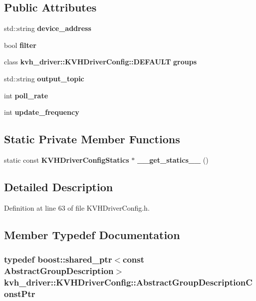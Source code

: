 \subsection*{\-Public \-Attributes}
\begin{DoxyCompactItemize}
\item 
std\-::string {\bf device\-\_\-address}
\item 
bool {\bf filter}
\item 
class \*
{\bf kvh\-\_\-driver\-::\-K\-V\-H\-Driver\-Config\-::\-D\-E\-F\-A\-U\-L\-T} {\bf groups}
\item 
std\-::string {\bf output\-\_\-topic}
\item 
int {\bf poll\-\_\-rate}
\item 
int {\bf update\-\_\-frequency}
\end{DoxyCompactItemize}
\subsection*{\-Static \-Private \-Member \-Functions}
\begin{DoxyCompactItemize}
\item 
static const \*
{\bf \-K\-V\-H\-Driver\-Config\-Statics} $\ast$ {\bf \-\_\-\-\_\-get\-\_\-statics\-\_\-\-\_\-} ()
\end{DoxyCompactItemize}


\subsection{\-Detailed \-Description}


\-Definition at line 63 of file \-K\-V\-H\-Driver\-Config.\-h.



\subsection{\-Member \-Typedef \-Documentation}
\subsubsection[{\-Abstract\-Group\-Description\-Const\-Ptr}]{\setlength{\rightskip}{0pt plus 5cm}typedef boost\-::shared\-\_\-ptr$<$const {\bf \-Abstract\-Group\-Description}$>$ {\bf kvh\-\_\-driver\-::\-K\-V\-H\-Driver\-Config\-::\-Abstract\-Group\-Description\-Const\-Ptr}}\label{classkvh__driver_1_1KVHDriverConfig_ad2313fbd530b3746e2c6d8435d619803}


